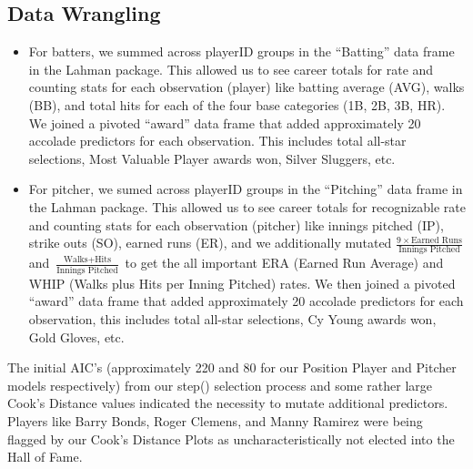 \documentclass[
]{article}
\begin{document}
\hypertarget{data-wrangling}{%
\subsection{Data Wrangling}\label{data-wrangling}}

\begin{itemize}
\item
  For batters, we summed across playerID groups in the ``Batting'' data
  frame in the Lahman package. This allowed us to see career totals for
  rate and counting stats for each observation (player) like batting
  average (AVG), walks (BB), and total hits for each of the four base
  categories (1B, 2B, 3B, HR). We joined a pivoted ``award'' data frame
  that added approximately 20 accolade predictors for each observation.
  This includes total all-star selections, Most Valuable Player awards
  won, Silver Sluggers, etc.
\item
  For pitcher, we sumed across playerID groups in the ``Pitching'' data
  frame in the Lahman package. This allowed us to see career totals for
  recognizable rate and counting stats for each observation (pitcher)
  like innings pitched (IP), strike outs (SO), earned runs (ER), and we
  additionally mutated
  \(\frac{9 \times \text{Earned Runs}}{\text{Innings Pitched}}\) and
  \(\frac{\text{Walks} + \text{Hits}}{\text{Innings Pitched}}\) to get
  the all important ERA (Earned Run Average) and WHIP (Walks plus Hits
  per Inning Pitched) rates. We then joined a pivoted ``award'' data
  frame that added approximately 20 accolade predictors for each
  observation, this includes total all-star selections, Cy Young awards
  won, Gold Gloves, etc.
\end{itemize}

The initial AIC's (approximately 220 and 80 for our Position Player and
Pitcher models respectively) from our step() selection process and some
rather large Cook's Distance values indicated the necessity to mutate
additional predictors. Players like Barry Bonds, Roger Clemens, and
Manny Ramirez were being flagged by our Cook's Distance Plots as
uncharacteristically not elected into the Hall of Fame.
\end{document}
